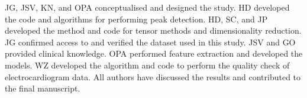 JG, JSV, KN, and OPA conceptualised and designed the study. HD developed the code and algorithms for performing peak detection. HD, SC, and JP developed the method and code for tensor methods and dimensionality reduction. JG confirmed access to and verified the dataset used in this study. JSV and GO provided clinical knowledge. OPA performed feature extraction and developed the models. WZ developed the algorithm and code to perform the quality check of electrocardiogram data. All authors have discussed the results and contributed to the final manuscript.